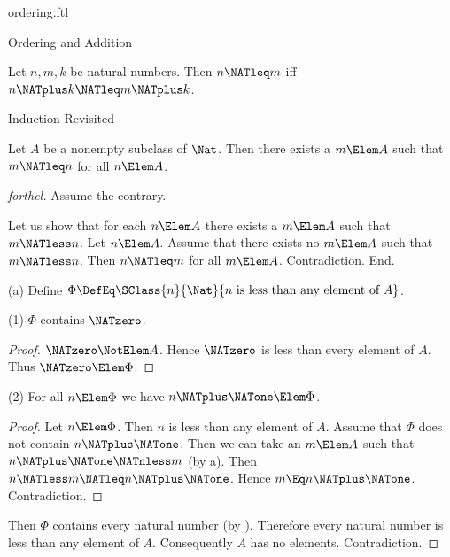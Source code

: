 \documentclass{stex}
\begin{document}
\begin{smodule}{ordering.ftl}
\begin{sfragment}{Ordering and Addition}
  \begin{corollary}[forthel]
    Let $n, m, k$ be natural numbers.
    Then $n \NATleq m$ iff $n \NATplus k \NATleq m \NATplus k$.
  \end{corollary}
\end{sfragment}

\begin{sfragment}{Induction Revisited}


  \begin{proposition}[forthel,name=wellfoundedness of ordering]
    Let $A$ be a nonempty subclass of $\Nat$.
    Then there exists a $m \Elem A$ such that $m \NATleq n$ for all $n \Elem A$.
  \end{proposition}
  \begin{proof}[forthel]
    Assume the contrary.

    Let us show that for each $n \Elem A$ there exists a $m \Elem A$ such that $m \NATless n$.
      Let $n \Elem A$.
      Assume that there exists no $m \Elem A$ such that $m \NATless n$.
      Then $n \NATleq m$ for all $m \Elem A$.
      Contradiction.
    End.

    (a) Define $\Phi \DefEq \SClass{n}{\Nat}{n\text{ is less than any element of }A}$.

    (1) $\Phi$ contains $\NATzero$.
    \begin{proof}
      $\NATzero \NotElem A$.
      Hence $\NATzero$ is less than every element of $A$.
      Thus $\NATzero \Elem \Phi$.
    \end{proof}

    (2) For all $n \Elem \Phi$ we have $n \NATplus \NATone \Elem \Phi$.
    \begin{proof}
      Let $n \Elem \Phi$.
      Then $n$ is less than any element of $A$.
      Assume that $\Phi$ does not contain $n \NATplus \NATone$.
      Then we can take an $m \Elem A$ such that $n \NATplus \NATone \NATnless m$ (by a).
      Then $n \NATless m \NATleq n \NATplus \NATone$.
      Hence $m \Eq n \NATplus \NATone$.
      Contradiction.
    \end{proof}

    Then $\Phi$ contains every natural number (by ).
    Therefore every natural number is less than any element of $A$.
    Consequently $A$ has no elements.
    Contradiction.
  \end{proof}



\end{sfragment}
\end{smodule}
\end{document}
